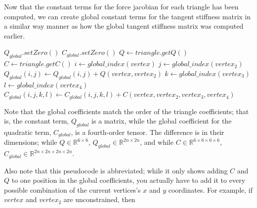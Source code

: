 \documentclass[twocolumn,10pt]{asme2ej}
\begin{document}
Now that the constant terms for the force jacobian for each triangle has been computed, we can create global constant terms for the tangent stiffness matrix in a similar way manner as how the global tangent stiffness matrix was computed earlier.

\begin{algorithmic}[1]
        \State $Q_{global}.setZero()$
        \State $C_{global}.setZero()$
         \State $Q \gets triangle.getQ()$
         \State $C \gets triangle.getC()$
                  \State $i \gets global\_index(vertex)$
                          \State $j \gets global\_index(vertex_2)$
                          \State $Q_{global}(i,j) \gets Q_{global}(i,j) + Q(vertex, vertex_2)$
                                \State $k \gets global\_index(vertex_3)$
                                    \State $l \gets global\_index(vertex_4)$
                                    \State $C_{global}(i,j,k,l)  \gets C_{global}(i,j,k,l)+C(vertex, vertex_2, vertex_3, vertex_4)$
                                  \EndFor
                            \EndFor
                      \EndIf
                    \EndFor
              \EndIf
            \EndFor
        \EndFor
    \EndFunction
\end{algorithmic}

Note that the global coefficients match the order of the triangle coefficients; that is, the constant term, $Q_{global}$ is a matrix, while the global coefficient for the quadratic term, $C_{global}$, is a fourth-order tensor. The difference is in their dimensions; while $Q \in \mathbb{R}^{6 \times 6}$, $Q_{global} \in \mathbb{R}^{2n \times 2n}$, and while  $C \in \mathbb{R}^{6 \times 6 \times 6 \times 6}$, $C_{global} \in \mathbb{R}^{2n \times 2n \times 2n \times 2n}$.

Also note that this pseudocode is abbreviated; while it only shows adding $C$ and $Q$ to one position in the global coefficients, you actually have to add it to every possible combination of the current vertices's $x$ and $y$ coordinates. For example, if $vertex$ and $vertex_2$ are unconstrained, then
\end{document}
